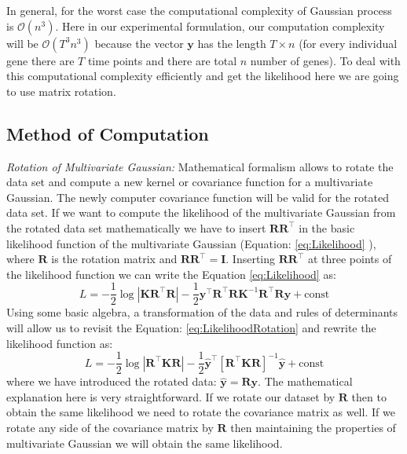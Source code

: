 In general, for the worst case the computational complexity of Gaussian process is $\mathcal{O}(n^3)$. Here in our experimental formulation, our computation complexity will be $\mathcal{O}(T^3n^3)$  because the vector $\mathbf{y}$ has the length $T\times n$ (for every individual gene there are $T$ time points and there are total $n$ number of genes). To deal with this computational complexity efficiently and get the likelihood here we are going to use matrix rotation. 

\subsection{Method of Computation}
\emph{Rotation of Multivariate Gaussian:} Mathematical formalism allows to rotate the data set and compute a new kernel or covariance function for a multivariate Gaussian. The newly computer covariance function will be valid for the rotated data set. If we want to compute the likelihood of the multivariate Gaussian from the rotated data set mathematically we have to insert $\mathbf{R}\mathbf{R}^\top$ in the basic likelihood function of the multivariate Gaussian (Equation: \ref{eq:Likelihood} ), where $\mathbf{R}$ is the rotation matrix and $\mathbf{R}\mathbf{R}^\top=\mathbf{I}$. Inserting $\mathbf{R}\mathbf{R}^\top$ at three points of the likelihood function we can write the Equation \ref{eq:Likelihood} as:
\begin{equation} \label{eq:LikelihoodRotation}
L = -\frac{1}{2} \log |\mathbf{K}\mathbf{R}^\top\mathbf{R}| 
- \frac{1}{2} \mathbf{y}^\top\mathbf{R}^\top\mathbf{R} \mathbf{K}^{-1}\mathbf{R}^\top\mathbf{R} \mathbf{y} 
+ \text{const}
\end{equation}
Using some basic algebra, a transformation of the data and rules of determinants will allow us to revisit the Equation: \ref{eq:LikelihoodRotation} and rewrite the likelihood function as:
\begin{equation} \label{eq:LikelihoodRotationRerite}
L = -\frac{1}{2} \log |\mathbf{R}^\top\mathbf{K}\mathbf{R}| 
- \frac{1}{2} \hat{\mathbf{y}}^\top \left[\mathbf{R}^\top\mathbf{K}\mathbf{R}\right]^{-1}\hat{\mathbf{y}} 
+ \text{const}
\end{equation}
where we have introduced the rotated data: $\hat{\mathbf{y}}=\mathbf{R} \mathbf{y}$. 
The mathematical explanation here is very straightforward. If we rotate our dataset by $\mathbf{R}$ then to obtain the same likelihood we need to rotate the covariance matrix as well. If we rotate any side of the covariance matrix by $\mathbf{R}$ then maintaining the properties of multivariate Gaussian we will obtain the same likelihood.

